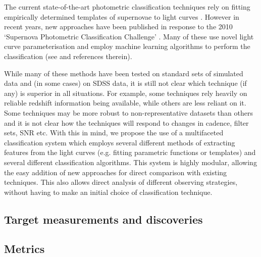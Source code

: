 The current state-of-the-art photometric classification techniques rely on fitting empirically 
determined templates of supernovae to light curves \citep{Jha2007,Guy2007,Sako2011}. However in 
recent years, new approaches have been published in response to the 2010 `Supernova 
Photometric Classification Challenge' \citep{Kessler2010a}. Many of these use novel light curve 
parameterisation and employ machine learning algorithms to perform the classification (see 
\citet{Kessler2010b} and references therein).

While many of these methods have been tested on standard sets of simulated data and (in some cases) 
on SDSS data, it is still not clear which technique (if any) is superior in all situations. For 
example, some techniques rely heavily on reliable redshift information being available, while others 
are less reliant on it. Some techniques may be more robust to non-representative datasets than 
others and it is not clear how the techniques will respond to changes in cadence, filter sets, SNR 
etc. With this in mind, we propose the use of a multifaceted classification system which employs 
several different methods of extracting features from the light curves (e.g. fitting parametric 
functions or templates) and several different classification algorithms. This system is highly 
modular, allowing the easy addition of new approaches for direct comparison with existing 
techniques. This also allows direct analysis of different observing strategies, without having to 
make an initial choice of classification technique. 


\subsection{Target measurements and discoveries}
\label{sec:keyword:targets}







\subsection{Metrics}
\label{sec:keyword:metrics}

